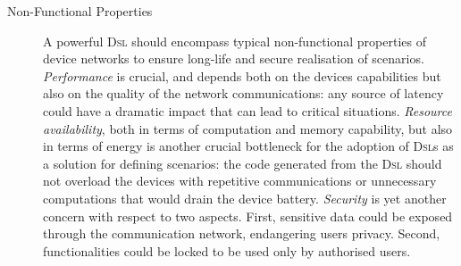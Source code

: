 \begin{description}
	\item[Non-Functional Properties] A powerful \textsc{Dsl} should encompass typical non-functional properties of device networks to ensure long-life and secure realisation of scenarios. \emph{Performance} is crucial, and depends both on the devices capabilities but also on the quality of the network communications: any source of latency could have a dramatic impact that can lead to critical situations. \emph{Resource availability}, both in terms of computation and memory capability, but also in terms of energy is another crucial bottleneck for the adoption of \textsc{Dsl}s as a solution for defining scenarios: the code generated from the \textsc{Dsl} should not overload the devices with repetitive communications or unnecessary computations that would drain the device battery. \emph{Security} is yet another concern with respect to two aspects. First, sensitive data could be exposed through the communication network, endangering users privacy. Second, functionalities could be locked to be used only by authorised users.

\end{description}
